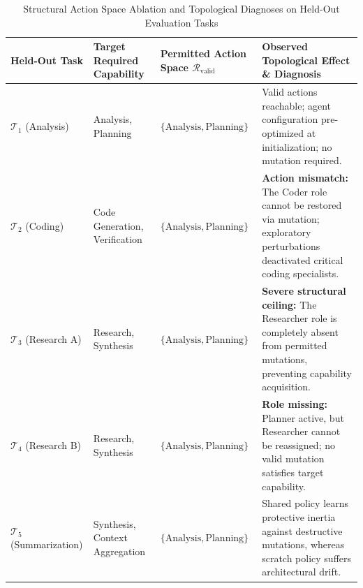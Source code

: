 \begin{table}[!t]
\centering
\caption{Structural Action Space Ablation and Topological Diagnoses on Held-Out Evaluation Tasks}
\label{tab:action_space_ablation}
\footnotesize
\begin{tabular}{lp{3.5cm}p{3.8cm}p{5.5cm}}
\toprule
\textbf{Held-Out Task} & \textbf{Target Required Capability} & \textbf{Permitted Action Space $\mathcal{R}_{\mathrm{valid}}$} & \textbf{Observed Topological Effect \& Diagnosis} \\
\midrule
$\mathcal{T}_1$ (Analysis) & Analysis, Planning & $\{\text{Analysis}, \text{Planning}\}$ & Valid actions reachable; agent configuration pre-optimized at initialization; no mutation required. \\
$\mathcal{T}_2$ (Coding) & Code Generation, Verification & $\{\text{Analysis}, \text{Planning}\}$ & \textbf{Action mismatch:} The Coder role cannot be restored via mutation; exploratory perturbations deactivated critical coding specialists. \\
$\mathcal{T}_3$ (Research A) & Research, Synthesis & $\{\text{Analysis}, \text{Planning}\}$ & \textbf{Severe structural ceiling:} The Researcher role is completely absent from permitted mutations, preventing capability acquisition. \\
$\mathcal{T}_4$ (Research B) & Research, Synthesis & $\{\text{Analysis}, \text{Planning}\}$ & \textbf{Role missing:} Planner active, but Researcher cannot be reassigned; no valid mutation satisfies target capability. \\
$\mathcal{T}_5$ (Summarization) & Synthesis, Context Aggregation & $\{\text{Analysis}, \text{Planning}\}$ & Shared policy learns protective inertia against destructive mutations, whereas scratch policy suffers architectural drift. \\
\bottomrule
\end{tabular}
\end{table}
